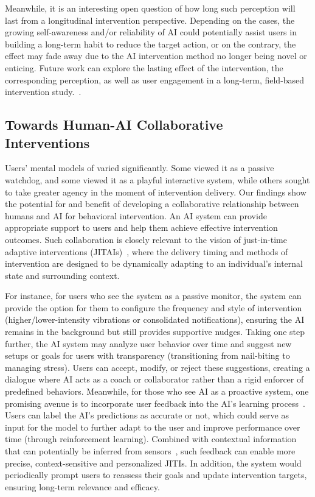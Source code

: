Meanwhile, it is an interesting open question of how long such perception will last from a longitudinal intervention perspective. Depending on the cases, the growing self-awareness and/or reliability of AI could potentially assist users in building a long-term habit to reduce the target action, or on the contrary, the effect may fade away due to the AI intervention method no longer being novel or enticing.
Future work can explore the lasting effect of the intervention, the corresponding perception, as well as user engagement in a long-term, field-based intervention study.~\cite{middleton2013long, short2018measuring, wei2020design}.


\subsection{Towards Human-AI Collaborative Interventions}
\label{sub:discussion:collaboration}
Users' mental models of \projectname varied significantly. Some viewed it as a passive watchdog, and some viewed it as a playful interactive system, while others sought to take greater agency in the moment of intervention delivery.
Our findings show the potential for and benefit of developing a collaborative relationship between humans and AI for behavioral intervention.
An AI system can provide appropriate support to users and help them achieve effective intervention outcomes.
Such collaboration is closely relevant to the vision of just-in-time adaptive interventions (JITAIs)~\cite{nahum-shani_translating_2021, nahum2018just}, where the delivery timing and methods of intervention are designed to be dynamically adapting to an individual's internal state and surrounding context.

For instance, for users who see the system as a passive monitor, the system can provide the option for them to configure the frequency and style of intervention (\eg higher/lower-intensity vibrations or consolidated notifications), ensuring the AI remains in the background but still provides supportive nudges.
Taking one step further, the AI system may analyze user behavior over time and suggest new setups or goals for users with transparency (\eg transitioning from nail-biting to managing stress). Users can accept, modify, or reject these suggestions, creating a dialogue where AI acts as a coach or collaborator rather than a rigid enforcer of predefined behaviors.
Meanwhile, for those who see AI as a proactive system, one promising avenue is to incorporate user feedback into the AI's learning process~\cite{orzikulova2024time2stop}. Users can label the AI's predictions as accurate or not, which could serve as input for the model to further adapt to the user and improve performance over time (\eg through reinforcement learning).
Combined with contextual information that can potentially be inferred from sensors~\cite{xu2023globem}, such feedback can enable more precise, context-sensitive and personalized JITIs.
In addition, the system would periodically prompt users to reassess their goals and update intervention targets, ensuring long-term relevance and efficacy.

